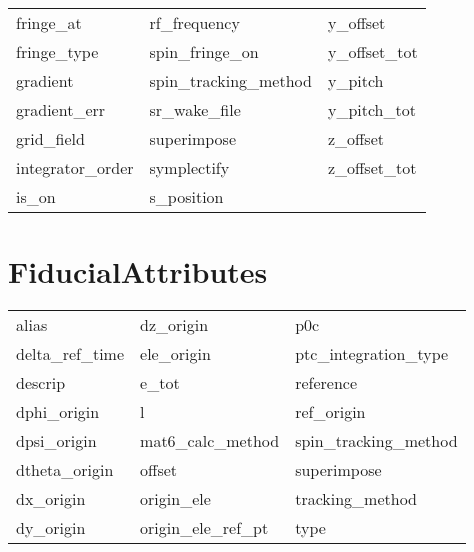 \begin{tabular}{lll}
fringe_at                   & rf_frequency                & y_offset                    \\
fringe_type                 & spin_fringe_on              & y_offset_tot                \\
gradient                    & spin_tracking_method        & y_pitch                     \\
gradient_err                & sr_wake_file                & y_pitch_tot                 \\
grid_field                  & superimpose                 & z_offset                    \\
integrator_order            & symplectify                 & z_offset_tot                \\
is_on                       & s_position                  &                             \\
 \bottomrule
 \end{tabular}
 \vfill
 
 \section{FiducialAttributes}
 \label{s:list.fiducial}
 
 \begin{tabular}{lll} \toprule
alias                       & dz_origin                   & p0c                         \\
delta_ref_time              & ele_origin                  & ptc_integration_type        \\
descrip                     & e_tot                       & reference                   \\
dphi_origin                 & l                           & ref_origin                  \\
dpsi_origin                 & mat6_calc_method            & spin_tracking_method        \\
dtheta_origin               & offset                      & superimpose                 \\
dx_origin                   & origin_ele                  & tracking_method             \\
dy_origin                   & origin_ele_ref_pt           & type                        \\
 \bottomrule
 \end{tabular}
 \vfill
 
